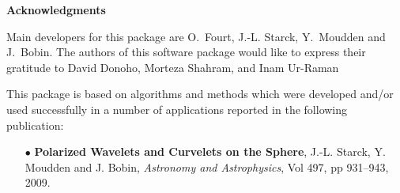 
\newpage
\thispagestyle{empty}
$ $
\newpage

{\Huge \bf Acknowledgments}\label{forewd}\\
\vspace{1cm}

Main developers for this package are  O.~Fourt, J.-L. Starck, Y.~Moudden and  J.~Bobin.
The authors of this software package would like to express their 
gratitude to David Donoho, Morteza Shahram, and Inam Ur-Raman 

This package is based on algorithms and methods which were 
developed and/or used successfully in a number of applications 
reported in the following publication: \\
\begin{itemize}
\item[$\bullet$] {\textbf{Polarized Wavelets and Curvelets on the Sphere}, J.-L. Starck, Y. Moudden and J. Bobin, \textit{Astronomy and Astrophysics}, Vol 497, pp 931--943, 2009.}
\end{itemize}

\newpage
\thispagestyle{empty}
$ $
\newpage


